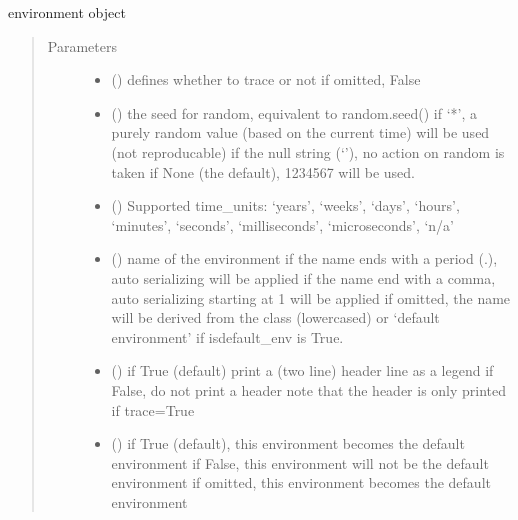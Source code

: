 \documentclass[letterpaper,10pt,english]{sphinxmanual}
\begin{document}
\begin{fulllineitems}
\label{\detokenize{Reference:salabim.Environment}}
environment object
\begin{quote}\begin{description}
\item[{Parameters}] \leavevmode\begin{itemize}
\item {} 
 () \textendash{} defines whether to trace or not 
if omitted, False

\item {} 
 (\sphinxstyleliteralemphasis{, }) \textendash{} the seed for random, equivalent to random.seed() 
if ‘*’, a purely random value (based on the current time) will be used
(not reproducable) 
if the null string (‘’), no action on random is taken 
if None (the default), 1234567 will be used.

\item {} 
 () \textendash{} Supported time\_units: 
‘years’, ‘weeks’, ‘days’, ‘hours’, ‘minutes’, ‘seconds’, ‘milliseconds’, ‘microseconds’, ‘n/a’

\item {} 
 () \textendash{} name of the environment 
if the name ends with a period (.),
auto serializing will be applied 
if the name end with a comma,
auto serializing starting at 1 will be applied 
if omitted, the name will be derived from the class (lowercased)
or ‘default environment’ if isdefault\_env is True.

\item {} 
 () \textendash{} if True (default) print a (two line) header line as a legend 
if False, do not print a header 
note that the header is only printed if trace=True

\item {} 
 () \textendash{} if True (default), this environment becomes the default environment 
if False, this environment will not be the default environment 
if omitted, this environment becomes the default environment 


\end{itemize}
\end{description}
\end{quote}
\end{fulllineitems}
\end{document}
